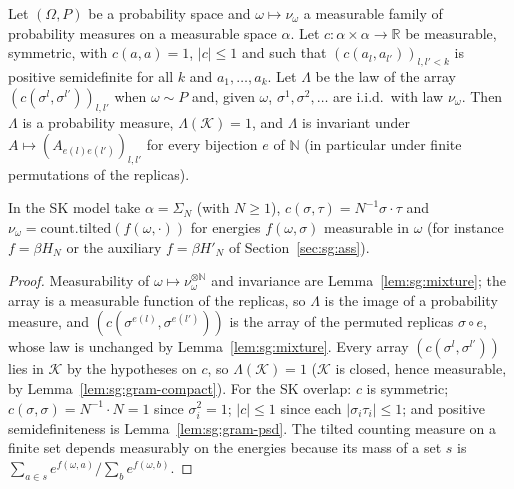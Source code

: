 \begin{theorem}\label{thm:sg:annealed-gram}
  \leanok
Let $(\Omega,P)$ be a probability space and $\omega\mapsto\nu_\omega$ a measurable family of probability measures on a measurable space $\alpha$. Let $c:\alpha\times\alpha\to\mathbb R$ be measurable,
symmetric, with $c(a,a)=1$, $|c|\le1$ and such that $(c(a_l,a_{l'}))_{l,l'<k}$ is positive semidefinite for all $k$ and $a_1,\dots,a_k$. Let $\Lambda$ be the law of the array $(c(\sigma^l,\sigma^{l'}))_{l,l'}$ when $\omega\sim P$ and,
given $\omega$, $\sigma^1,\sigma^2,\dots$ are i.i.d.\ with law $\nu_\omega$. Then $\Lambda$ is a probability measure, $\Lambda(\mathcal K)=1$, and $\Lambda$ is invariant under $A\mapsto(A_{e(l)e(l')})_{l,l'}$ for
every bijection $e$ of $\mathbb N$ (in particular under finite permutations of the replicas).

In the SK model take $\alpha=\Sigma_N$ (with $N\ge1$), $c(\sigma,\tau)=N^{-1}\sigma\cdot\tau$ and $\nu_\omega=\mathrm{count.tilted}(f(\omega,\cdot))$ for energies $f(\omega,\sigma)$ measurable in $\omega$
(for instance $f=\beta H_N$ or the auxiliary $f=\beta H'_N$ of Section~\ref{sec:sg:ass}).
\end{theorem}

\begin{proof}
  \leanok
Measurability of $\omega\mapsto\nu_\omega^{\otimes\mathbb N}$ and invariance are Lemma~\ref{lem:sg:mixture}; the array is a measurable function of the replicas, so $\Lambda$ is the image of a probability measure, and
$(c(\sigma^{e(l)},\sigma^{e(l')}))$ is the array of the permuted replicas $\sigma\circ e$, whose law is unchanged by Lemma~\ref{lem:sg:mixture}. Every array $(c(\sigma^l,\sigma^{l'}))$ lies in $\mathcal K$ by the hypotheses on $c$, so $\Lambda(\mathcal K)=1$
($\mathcal K$ is closed, hence measurable, by Lemma~\ref{lem:sg:gram-compact}). For the SK overlap: $c$ is symmetric; $c(\sigma,\sigma)=N^{-1}\cdot N=1$ since $\sigma_i^2=1$; $|c|\le1$ since each $|\sigma_i\tau_i|\le1$; and positive semidefiniteness is
Lemma~\ref{lem:sg:gram-psd}. The tilted counting measure on a finite set depends measurably on the energies because its mass of a set $s$ is $\sum_{a\in s}e^{f(\omega,a)}/\sum_be^{f(\omega,b)}$.
\end{proof}

